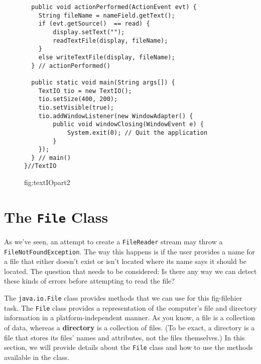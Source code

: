 \begin{figure}[tb]
\addtocounter{figure}{-1}
\jjjprogstart
\begin{jjjlisting}
\begin{lstlisting}
  public void actionPerformed(ActionEvent evt) {
    String fileName = nameField.getText();
    if (evt.getSource()  == read) {
        display.setText("");
        readTextFile(display, fileName);
    }
    else writeTextFile(display, fileName);
  } // actionPerformed()

  public static void main(String args[]) {
    TextIO tio = new TextIO();
    tio.setSize(400, 200);
    tio.setVisible(true);
    tio.addWindowListener(new WindowAdapter() {      
        public void windowClosing(WindowEvent e) {
            System.exit(0); // Quit the application
        }
    });
  } // main()
}//TextIO
\end{lstlisting}
\end{jjjlisting}
{fig:textIOpart2}

\end{figure}

\pagebreak
\section{The {\tt File} Class}
\label{the-class}
\noindent As we've seen, an attempt to create a {\tt FileReader}
stream may throw a {\tt FileNotFoundException}. The way this happens
is if the user provides a name for a file that either doesn't exist or 
isn't located where its name says it should be located.  The question that
needs to be considered: Is there any
way we can detect these kinds of errors before attempting to read the
file?

The {\tt java.io.File} class provides methods that we can use for this
{fig-filehier}
task.  The {\tt File} class provides a representation of the computer's
file and directory information in a platform-independent manner.  As you
know, a file is a collection of data, whereas a {\bf directory}
is a collection of files.  (To be exact, a directory is a file that stores
its files' names and attributes, not the files themselves.) In this section,
we will provide details about the {\tt File} class and how to
use the methods available in the class.

